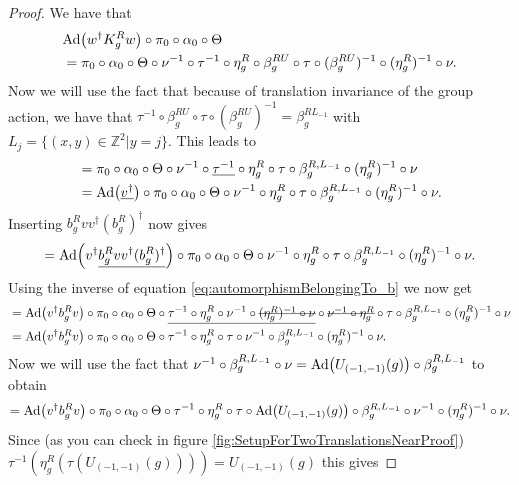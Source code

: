 \documentclass[12pt,a4paper,twoside]{article}
\newcommand{\stkout}[1]{\ifmmode\text{\sout{\ensuremath{#1}}}\else\sout{#1}\fi}
\let\originalleft\left
\let\originalright\right
\renewcommand{\left}{\mathopen{}\mathclose\bgroup\originalleft}
\renewcommand{\right}{\aftergroup\egroup\originalright}
\newcommand{\ZZ}{\mathbb Z}
\newcommand{\Ad}[1]{\textrm{Ad}\left(#1\right)}
\theoremstyle{definition}
\numberwithin{equation}{section}
\begin{document}
\begin{proof}
	We have that
	\begin{align}
		&\Ad{w^\dagger K_g^R w}\circ\pi_0\circ\alpha_0\circ\Theta\\
		&=\pi_0\circ\alpha_0\circ\Theta\circ\nu^{-1}\circ\tau^{-1}\circ\eta_g^R\circ\beta_g^{RU}\circ\tau\circ(\beta_g^{RU})^{-1}\circ(\eta_g^R)^{-1}\circ\nu.
	\end{align}
	Now we will use the fact that because of translation invariance of the group action, we have that $\tau^{-1}\circ\beta_g^{RU}\circ\tau\circ(\beta_g^{RU})^{-1}=\beta_g^{RL_{-1}}$ with $L_j=\{(x,y)\in\ZZ^2|y=j\}$. This leads to
	\begin{align}
		&=\pi_0\circ\alpha_0\circ\Theta\circ\nu^{-1}\circ\underline{\tau^{-1}}\circ\eta_g^R\circ\tau\circ\beta_g^{R,L_{-1}}\circ(\eta_g^R)^{-1}\circ\nu\\
		&=\Ad{\underline{v^\dagger}}\circ \pi_0\circ\alpha_0\circ\Theta\circ\nu^{-1}\circ\eta_g^R\circ\tau\circ\beta_g^{R,L_{-1}}\circ(\eta_g^R)^{-1}\circ\nu.
	\end{align}
	Inserting $b^R_g v v^\dagger (b^R_g)^\dagger$ now gives
	\begin{equation}
		=\Ad{v^\dagger\underline{b^R_g v v^\dagger (b^R_g)^\dagger}}\circ \pi_0\circ\alpha_0\circ\Theta\circ\nu^{-1}\circ\eta_g^R\circ\tau\circ\beta_g^{R,L_{-1}}\circ(\eta_g^R)^{-1}\circ\nu.
	\end{equation}
	 Using the inverse of equation \eqref{eq:automorphismBelongingTo_b} we now get
	\begin{align}
		&=\Ad{v^\dagger b^R_g v }\circ \pi_0\circ\alpha_0\circ\Theta\circ\underline{\tau^{-1}\circ\eta_g^R\circ\nu^{-1}\circ\stkout{(\eta_g^R)^{-1}\circ\nu}}\circ\stkout{\nu^{-1}\circ\eta_g^R}\circ\tau\circ\beta_g^{R,L_{-1}}\circ(\eta_g^R)^{-1}\circ\nu\\
		&=\Ad{v^\dagger b_g^R v}\circ\pi_0\circ\alpha_0\circ\Theta\circ\tau^{-1}\circ\eta_g^R\circ\tau\circ\nu^{-1}\circ\beta_g^{R,L_{-1}}\circ(\eta_g^R)^{-1}\circ\nu.
	\end{align}
	Now we will use the fact that $\nu^{-1}\circ\beta_g^{R,L_{-1}}\circ\nu=\Ad{U_{(-1,-1)}(g)}\circ\beta_g^{R,L_{-1}}$ to obtain
	\begin{equation}
		=\Ad{v^\dagger b_g^R v}\circ\pi_0\circ\alpha_0\circ\Theta\circ\tau^{-1}\circ\eta_g^R\circ\tau\circ\Ad{U_{(-1,-1)}(g)}\circ\beta_g^{R,L_{-1}}\circ\nu^{-1}\circ(\eta_g^R)^{-1}\circ\nu.
	\end{equation}
	Since (as you can check in figure \ref{fig:SetupForTwoTranslationsNearProof}) $\tau^{-1}(\eta_g^R(\tau(U_{(-1,-1)}(g))))=U_{(-1,-1)}(g)$ this gives

\end{proof}
\end{document}
